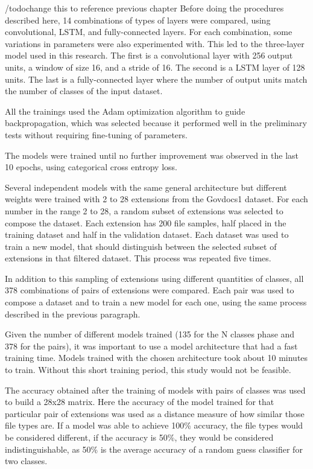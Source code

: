 /todo{change this to reference previous chapter}
Before doing the procedures described here, 14 combinations of types of layers were compared, using convolutional, LSTM, and fully-connected layers. For each combination, some variations in parameters were also experimented with. This led to the three-layer model used in this research. The first is a convolutional layer with 256 output units, a window of size 16, and a stride of 16. The second is a LSTM layer of 128 units. The last is a fully-connected layer where the number of output units match the number of classes of the input dataset.

All the trainings used the Adam \cite{kingma_adam:_2014}
optimization algorithm to guide backpropagation, which was selected because it performed well in the preliminary tests without requiring fine-tuning of parameters.

The models were trained until no further improvement was observed in the last 10 epochs, using categorical cross entropy loss.

Several independent models with the same general architecture but different weights were trained with 2 to 28 extensions from the Govdocs1 dataset. For each number in the range 2 to 28, a random subset of extensions was selected to compose the dataset. Each extension has 200 file samples, half placed in the training dataset and half in the validation dataset. Each dataset was used to train a new model, that should distinguish between the selected subset of extensions in that filtered dataset. This process was repeated five times.

In addition to this sampling of extensions using different quantities of classes, all 378 combinations of pairs of extensions were compared. Each pair was used to compose a dataset and to train a new model for each one, using the same process described in the previous paragraph.

Given the number of different models trained (135 for the N classes phase and 378 for the pairs), it was important to use a model architecture that had a fast training time. Models trained with the chosen architecture took about 10 minutes to train. Without this short training period, this study would not be feasible.

The accuracy obtained after the training of models with pairs of classes was used to build a 28x28 matrix. Here the accuracy of the model trained for that particular pair of extensions was used as a distance measure of how similar those file types are. If a model was able to achieve 100\% accuracy, the file types would be considered different, if the accuracy is 50\%, they would be considered indistinguishable, as 50\% is the average accuracy of a random guess classifier for two classes.

